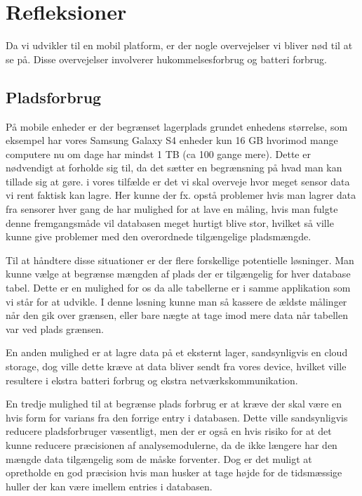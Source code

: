 \section{Refleksioner}
Da vi udvikler til en mobil platform, er der nogle overvejelser vi bliver nød til at se på.
Disse overvejelser involverer hukommelsesforbrug og batteri forbrug.

\subsection{Pladsforbrug}
På mobile enheder er der begrænset lagerplads grundet enhedens størrelse, som eksempel har vores Samsung Galaxy S4 enheder kun 16 GB hvorimod mange computere nu om dage har mindst 1 TB (ca 100 gange mere).
Dette er nødvendigt at forholde sig til, da det sætter en begrænsning på hvad man kan tillade sig at gøre.
i vores tilfælde er det vi skal overveje hvor meget sensor data vi rent faktisk kan lagre.
Her kunne der fx. opstå problemer hvis man lagrer data fra sensorer hver gang de har mulighed for at lave en måling, hvis man fulgte denne fremgangsmåde vil databasen meget hurtigt blive stor, hvilket så ville kunne give problemer med den overordnede tilgængelige pladsmængde.

Til at håndtere disse situationer er der flere forskellige potentielle løsninger.
Man kunne vælge at begrænse mængden af plads der er tilgængelig for hver database tabel.
Dette er en mulighed for os da alle tabellerne er i samme applikation som vi står for at udvikle.
I denne løsning kunne man så kassere de ældste målinger når den gik over grænsen, eller bare nægte at tage imod mere data når tabellen var ved plads grænsen.

En anden mulighed er at lagre data på et eksternt lager, sandsynligvis en cloud storage, dog ville dette kræve at data bliver sendt fra vores device, hvilket ville resultere i ekstra batteri forbrug og ekstra netværkskommunikation.

En tredje mulighed til at begrænse plads forbrug er at kræve der skal være en hvis form for varians fra den forrige entry i databasen. Dette ville sandsynligvis reducere pladsforbruger væsentligt, men der er også en hvis risiko for at det kunne reducere præcisionen af analysemodulerne, da de ikke længere har den mængde data tilgængelig som de måske forventer.
Dog er det muligt at opretholde en god præcision hvis man husker at tage højde for de tidsmæssige huller der kan være imellem entries i databasen.

